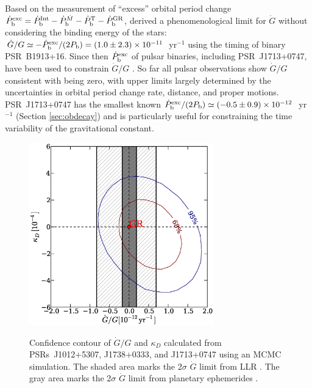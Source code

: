 Based on the measurement of ``excess'' orbital period change 
$\dot{P}_{\rm b}^{\rm exc}=\dot{P}_{\rm b}^{\rm Int} - \dot{P}_{\rm
b}^{\dot{M}}  - \dot{P}_{\rm b}^{\rm T} - \dot{P}_{\rm b}^{\rm GR}$,
\citet{dgt88} derived a phenomenological limit for $\dot{G}$ without considering the binding energy of the stars: 
$\dot{G}/G\simeq-\dot{P}_{\rm b}^{\rm exc}/(2P_{\rm
b})=(1.0\pm2.3)\times10^{-11}$~yr$^{-1}$ using the timing of binary PSR~B1913+16. 
Since then $\dot{P}_{\rm b}^{\rm exc}$ of pulsar binaries, including 
PSR~J1713+0747, have been used to 
constrain $\dot{G}/G$ \citep{ktr94, nss+05, dvtb08, lwj+09, fwe+12}. 
So far all pulsar observations show $\dot{G}/G$ consistent with being zero, with 
upper limits largely determined by the uncertainties in orbital period change rate, distance, 
and proper motions.
PSR~J1713+0747 has the smallest known $\dot{P}_{\rm b}^{\rm exc}/(2P_{\rm
b})\simeq(-0.5\pm0.9)\times10^{-12}$~yr$^{-1}$ (Section \ref{sec:obdecay}) and is
particularly useful for constraining the time variability of the gravitational
constant.

\begin{figure}
\includegraphics[width=8cm]{finalGdot.ps} \\ 
\caption {\label{fig:Gdot} Confidence contour of $\dot{G}/G$ and $\kappa_D$
calculated from PSRs~J1012+5307, J1738+0333, and J1713+0747 using an MCMC simulation.
The shaded area marks the 2$\sigma$ $\dot{G}$ limit from LLR \citep{hmb10}. The gray area
marks the 2$\sigma$ $\dot{G}$ limit from planetary ephemerides \citep{fle+14}.
} 
\end{figure} 


